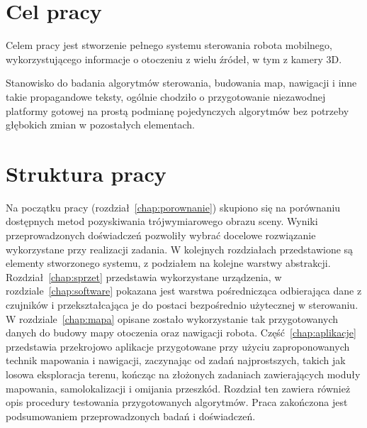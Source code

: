 \section{Cel pracy}

Celem pracy jest stworzenie pełnego systemu sterowania robota mobilnego,
wykorzystującego informacje o otoczeniu z wielu źródeł, w tym z kamery 3D.

Stanowisko do badania algorytmów sterowania, budowania map, nawigacji i inne takie
propagandowe teksty, ogólnie chodziło o przygotowanie niezawodnej platformy
gotowej na prostą podmianę pojedynczych algorytmów bez potrzeby głębokich
zmian w pozostałych elementach.

\section{Struktura pracy}

Na początku pracy (rozdział~\ref{chap:porownanie}) skupiono się na porównaniu
dostępnych metod pozyskiwania trójwymiarowego
obrazu sceny. Wyniki przeprowadzonych doświadczeń pozwoliły wybrać docelowe rozwiązanie
wykorzystane przy realizacji zadania. W kolejnych rozdziałach przedstawione są elementy
stworzonego systemu, z podziałem na kolejne warstwy abstrakcji. Rozdział~\ref{chap:sprzet}
przedstawia wykorzystane urządzenia, w rozdziale~\ref{chap:software} pokazana jest
warstwa pośrednicząca odbierająca dane z czujników i przekształcająca je do postaci
bezpośrednio użytecznej w sterowaniu. W rozdziale~\ref{chap:mapa} opisane zostało
wykorzystanie tak przygotowanych danych do budowy mapy otoczenia oraz nawigacji robota.
Część~\ref{chap:aplikacje} przedstawia przekrojowo aplikacje przygotowane
przy użyciu zaproponowanych technik mapowania i nawigacji, zaczynając od zadań
najprostszych, takich jak losowa eksploracja terenu, kończąc na złożonych zadaniach
zawierających moduły mapowania, samolokalizacji i omijania przeszkód. Rozdział ten
zawiera również opis procedury testowania przygotowanych algorytmów. Praca zakończona
jest podsumowaniem przeprowadzonych badań i doświadczeń.


